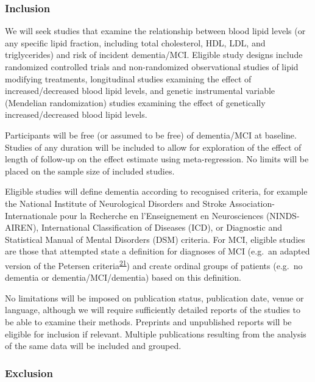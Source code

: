 \documentclass[a4paper, twoside]{templates/ociamthesis}
\begin{document}
\hypertarget{inclusion}{%
\subsubsection{Inclusion}\label{inclusion}}

We will seek studies that examine the relationship between blood lipid levels (or any specific lipid fraction, including total cholesterol, HDL, LDL, and triglycerides) and risk of incident dementia/MCI. Eligible study designs include randomized controlled trials and non-randomized observational studies of lipid modifying treatments, longitudinal studies examining the effect of increased/decreased blood lipid levels, and genetic instrumental variable (Mendelian randomization) studies examining the effect of genetically increased/decreased blood lipid levels.

Participants will be free (or assumed to be free) of dementia/MCI at baseline. Studies of any duration will be included to allow for exploration of the effect of length of follow-up on the effect estimate using meta-regression. No limits will be placed on the sample size of included studies.

Eligible studies will define dementia according to recognised criteria, for example the National Institute of Neurological Disorders and Stroke Association-Internationale pour la Recherche en l'Enseignement en Neurosciences (NINDS-AIREN), International Classification of Diseases (ICD), or Diagnostic and Statistical Manual of Mental Disorders (DSM) criteria. For MCI, eligible studies are those that attempted state a definition for diagnoses of MCI (e.g.~an adapted version of the Petersen criteria\textsuperscript{\protect\hyperlink{ref-petersen1999}{21}}) and create ordinal groups of patients (e.g.~no dementia or dementia/MCI/dementia) based on this definition.

No limitations will be imposed on publication status, publication date, venue or language, although we will require sufficiently detailed reports of the studies to be able to examine their methods. Preprints and unpublished reports will be eligible for inclusion if relevant. Multiple publications resulting from the analysis of the same data will be included and grouped.

\hypertarget{exclusion}{%
\subsubsection{Exclusion}\label{exclusion}}
\end{document}
